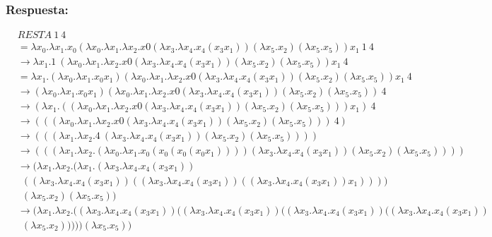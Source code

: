 \documentclass{article}
\begin{document}
\begin{enumerate}
\subsubsection*{Respuesta:}
\begin{align*}
&RESTA\ 1\ 4
\\&= \lambda x_0 .\lambda x_1 . x_0 (\lambda x_0 .\lambda x_1 .\lambda x_2 . x0 (\lambda x_3 .\lambda x_4 . x_4 ( x_3 x_1 ))(\lambda x_5 . x_2 )(\lambda x_5 . x_5 )) x_1\ 1\ 4
\\&\rightarrow \lambda x_1 . 1\ (\lambda x_0 .\lambda x_1 .\lambda x_2 . x0 (\lambda x_3 .\lambda x_4 . x_4 ( x_3 x_1 ))(\lambda x_5 . x_2 )(\lambda x_5 . x_5 )) x_1\ 4
\\&= \lambda x_1 . ( \lambda x_0 .\lambda x_1 . x_0 x_1)(\lambda x_0 .\lambda x_1 .\lambda x_2 . x0 (\lambda x_3 .\lambda x_4 . x_4 ( x_3 x_1 ))(\lambda x_5 . x_2 )(\lambda x_5 . x_5 )) x_1\ 4
\\&\rightarrow ( \lambda x_0 .\lambda x_1 . x_0 x_1)(\lambda x_0 .\lambda x_1 .\lambda x_2 . x0 (\lambda x_3 .\lambda x_4 . x_4 ( x_3 x_1 ))(\lambda x_5 . x_2 )(\lambda x_5 . x_5 ))\ 4
\\&\rightarrow (\lambda x_1 . ((\lambda x_0 .\lambda x_1 .\lambda x_2 . x0 (\lambda x_3 .\lambda x_4 . x_4 ( x_3 x_1 ))(\lambda x_5 . x_2 )(\lambda x_5 . x_5 ))) x_1)\ 4
\\&\rightarrow (((\lambda x_0 .\lambda x_1 .\lambda x_2 . x0 (\lambda x_3 .\lambda x_4 . x_4 ( x_3 x_1 ))(\lambda x_5 . x_2 )(\lambda x_5 . x_5 )))\ 4)
\\&\rightarrow (((\lambda x_1 .\lambda x_2 . 4\ (\lambda x_3 .\lambda x_4 . x_4 ( x_3 x_1 ))(\lambda x_5 . x_2 )(\lambda x_5 . x_5 ))))
\\&\rightarrow (((\lambda x_1 .\lambda x_2 . (\lambda x_0 . \lambda x_1 . x_0 ( x_0 ( x_0 ( x_0 x_1 ))))(\lambda x_3 .\lambda x_4 . x_4 ( x_3 x_1 ))(\lambda x_5 . x_2 )(\lambda x_5 . x_5 ))))
\\&\rightarrow (\lambda x_1 .\lambda x_2 .(\lambda x_1 . (\lambda x_3 .\lambda x_4 . x_4 ( x_3 x_1 ))\\&\ \ ( (\lambda x_3 .\lambda x_4 . x_4 ( x_3 x_1 )) ( (\lambda x_3 .\lambda x_4 . x_4 ( x_3 x_1 ))( (\lambda x_3 .\lambda x_4 . x_4 ( x_3 x_1 )) x_1 ))))\\&\ \ (\lambda x_5 . x_2 )(\lambda x_5 . x_5 ))
\\&\rightarrow (\lambda x_1 .\lambda x_2 . ((\lambda x_3 .\lambda x_4 . x_4 ( x_3 x_1 )) ( (\lambda x_3 .\lambda x_4 . x_4 ( x_3 x_1 )) ( (\lambda x_3 .\lambda x_4 . x_4 ( x_3 x_1 )) ( (\lambda x_3 .\lambda x_4 . x_4 ( x_3 x_1 ))\\&\ \ (\lambda x_5 . x_2 ) ))))(\lambda x_5 . x_5 ))

\end{align*}
\end{enumerate}
\end{document}
